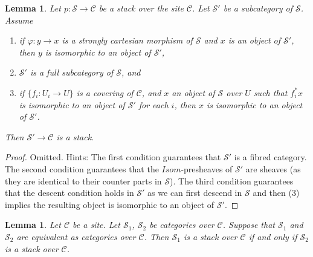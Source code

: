 \documentclass{stacks-project}
\theoremstyle{plain}
\newtheorem{lemma}[subsection]{Lemma}
\theoremstyle{definition}
\theoremstyle{remark}
\numberwithin{equation}{subsection}
\begin{document}
\begin{lemma}
\label{lemma-substack}
Let $p : \mathcal{S} \to \mathcal{C}$ be a stack over the site $\mathcal{C}$.
Let $\mathcal{S}'$ be a subcategory of $\mathcal{S}$.
Assume
\begin{enumerate}
\item if $\varphi : y \to x$ is a strongly cartesian
morphism of $\mathcal{S}$ and
$x$ is an object of $\mathcal{S}'$, then $y$ is isomorphic to an
object of $\mathcal{S}'$,
\item $\mathcal{S}'$ is a full subcategory of $\mathcal{S}$, and
\item if $\{f_i : U_i \to U\}$ is a covering of $\mathcal{C}$,
and $x$ an object of $\mathcal{S}$ over $U$ such that $f_i^*x$
is isomorphic to an object of $\mathcal{S}'$ for each $i$,
then $x$ is isomorphic to an object of $\mathcal{S}'$.
\end{enumerate}
Then $\mathcal{S}' \to \mathcal{C}$ is a stack.
\end{lemma}

\begin{proof}
Omitted. Hints:
The first condition guarantees that $\mathcal{S}'$ is a fibred category.
The second condition guarantees that the $\mathit{Isom}$-presheaves
of $\mathcal{S}'$ are sheaves (as they are identical to their counter parts
in $\mathcal{S}$). The third condition guarantees that the descent condition
holds in $\mathcal{S}'$ as we can first descend in $\mathcal{S}$ and
then (3) implies the resulting object is isomorphic to an object of
$\mathcal{S}'$.
\end{proof}

\begin{lemma}
\label{lemma-stack-equivalent}
Let $\mathcal{C}$ be a site.
Let $\mathcal{S}_1$, $\mathcal{S}_2$ be categories over $\mathcal{C}$.
Suppose that $\mathcal{S}_1$ and $\mathcal{S}_2$ are equivalent
as categories over $\mathcal{C}$.
Then $\mathcal{S}_1$ is a stack over $\mathcal{C}$ if and only if
$\mathcal{S}_2$ is a stack over $\mathcal{C}$.
\end{lemma}
\end{document}
